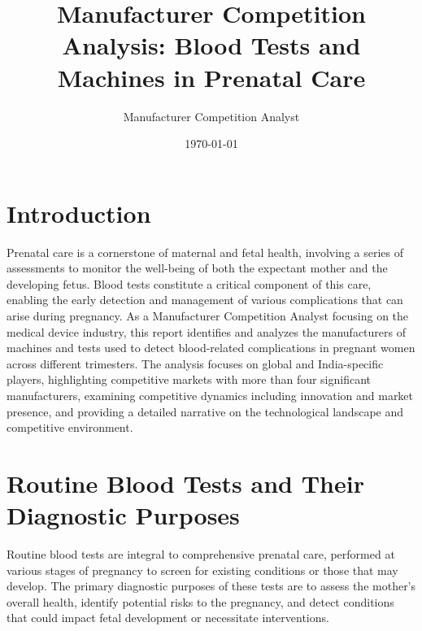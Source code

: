 \documentclass{article}
\title{Manufacturer Competition Analysis: Blood Tests and Machines in Prenatal Care}
\author{Manufacturer Competition Analyst}
\date{\today}
\begin{document}
\maketitle

\section{Introduction}
Prenatal care is a cornerstone of maternal and fetal health, involving a series of assessments to monitor the well-being of both the expectant mother and the developing fetus. Blood tests constitute a critical component of this care, enabling the early detection and management of various complications that can arise during pregnancy. As a Manufacturer Competition Analyst focusing on the medical device industry, this report identifies and analyzes the manufacturers of machines and tests used to detect blood-related complications in pregnant women across different trimesters. The analysis focuses on global and India-specific players, highlighting competitive markets with more than four significant manufacturers, examining competitive dynamics including innovation and market presence, and providing a detailed narrative on the technological landscape and competitive environment.

\section{Routine Blood Tests and Their Diagnostic Purposes}
Routine blood tests are integral to comprehensive prenatal care, performed at various stages of pregnancy to screen for existing conditions or those that may develop. The primary diagnostic purposes of these tests are to assess the mother's overall health, identify potential risks to the pregnancy, and detect conditions that could impact fetal development or necessitate interventions.
\end{document}
